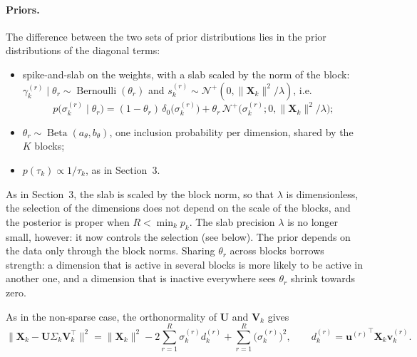 \documentclass[11pt]{article}
\DeclareMathOperator{\Bern}{Bernoulli}
\DeclareMathOperator{\Be}{Beta}
\newcommand{\X}{\mathbf{X}}
\newcommand{\U}{\mathbf{U}}
\newcommand{\V}{\mathbf{V}}
\newcommand{\uu}{\mathbf{u}}
\newcommand{\vv}{\mathbf{v}}
\begin{document}
\paragraph{Priors.} The difference between the two sets of prior distributions lies in the prior distributions of the diagonal terms: 
\begin{itemize}
  \item spike-and-slab on the weights, with a slab scaled by the norm of the block:
        $\gamma_k^{(r)}\mid\theta_r\sim\Bern(\theta_r)$ and $s_k^{(r)}\sim\mathcal N^+(0,\|\X_k\|^2/\lambda)$, i.e.\
        \[
          p\bigl(\sigma_k^{(r)}\mid\theta_r\bigr)=(1-\theta_r)\,\delta_0\bigl(\sigma_k^{(r)}\bigr)+\theta_r\,\mathcal N^+\bigl(\sigma_k^{(r)};0,\|\X_k\|^2/\lambda\bigr);
        \]
  \item $\theta_r\sim\Be(a_\theta,b_\theta)$, one inclusion probability per dimension, shared by the $K$ blocks;
  \item $p(\tau_k)\propto1/\tau_k$, as in Section~3.
\end{itemize}
As in Section~3, the slab is scaled by the block norm, so that $\lambda$ is dimensionless, the selection of the dimensions does not depend on the scale of the blocks, and the posterior is proper when $R<\min_kp_k$. The slab precision $\lambda$ is no longer small, however: it now controls the selection (see below). The prior depends on the data only through the block norms.
Sharing $\theta_r$ across blocks borrows strength: a dimension that is active in several blocks is more likely
to be active in another one, and a dimension that is inactive everywhere sees $\theta_r$ shrink towards zero.

As in the non-sparse case, the orthonormality of $\U$ and $\V_k$ gives
\begin{equation}
  \bigl\|\X_k-\U\Sigma_k\V_k^\intercal\bigr\|^2=\|\X_k\|^2-2\sum_{r=1}^R\sigma_k^{(r)}d_k^{(r)}+\sum_{r=1}^R\bigl(\sigma_k^{(r)}\bigr)^2,
  \qquad d_k^{(r)}={\uu^{(r)}}^\intercal\X_k\vv_k^{(r)} .
  \label{eq:expand2}
\end{equation}
\end{document}

